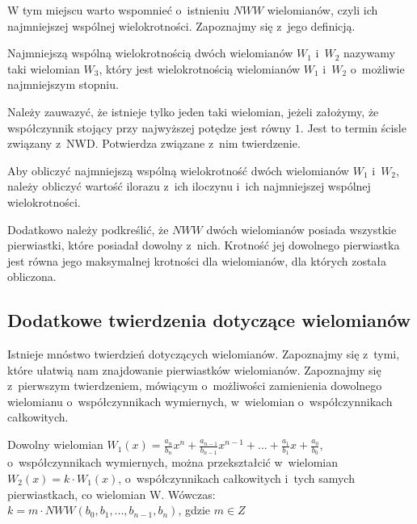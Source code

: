 W tym miejscu warto wspomnieć o~istnieniu $NWW$ wielomianów, czyli ich najmniejszej wspólnej wielokrotności. Zapoznajmy się z~jego definicją.

\begin{definition}
	$ $\\
	Najmniejszą wspólną wielokrotnością dwóch wielomianów $W_1$ i~$W_2$ nazywamy taki wielomian $W_3$, który jest wielokrotnością wielomianów $W_1$ i~$W_2$ o~możliwie najmniejszym stopniu.
\end{definition}

Należy zauwazyć, że istnieje tylko jeden taki wielomian, jeżeli założymy, że współczynnik stojący przy najwyższej potędze jest równy $1$. Jest to termin ścisle związany z~NWD. Potwierdza związane z~nim twierdzenie.

\begin{theorem}
	Aby obliczyć najmniejszą wspólną wielokrotność dwóch wielomianów $W_1$ i~$W_2$, należy obliczyć wartość ilorazu z~ich iloczynu i~ich najmniejszej wspólnej wielokrotności.
\end{theorem}

Dodatkowo należy podkreślić, że $NWW$ dwóch wielomianów posiada wszystkie pierwiastki, które posiadał dowolny z~nich. Krotność jej dowolnego pierwiastka jest równa jego maksymalnej krotności dla wielomianów, dla których została obliczona.

\subsection{Dodatkowe twierdzenia dotyczące wielomianów}

Istnieje mnóstwo twierdzień dotyczących wielomianów. Zapoznajmy się z~tymi, które ułatwią nam znajdowanie pierwiastków wielomianów. Zapoznajmy się z~pierwszym twierdzeniem, mówiącym o~możliwości zamienienia dowolnego wielomianu o~współczynnikach wymiernych, w~wielomian o~współczynnikach całkowitych.

\begin{theorem}
	$ $\\
	Dowolny wielomian $W_1(x) = \frac{a_n}{b_n}x^n + \frac{a_{n-1}}{b_{n-1}}x^{n-1} + ... + \frac{a_1}{b_1}x + \frac{a_0}{b_0}$, o~współczynnikach wymiernych, można przekształcić w~wielomian $W_2(x) = k \cdot W_1(x)$, o~współczynnikach całkowitych i~tych samych pierwiastkach, co wielomian W. Wówczas: \\
	$k = m \cdot NWW(b_0, b_1, ..., b_{n-1}, b_n)$, gdzie $m\in Z$
\end{theorem}

